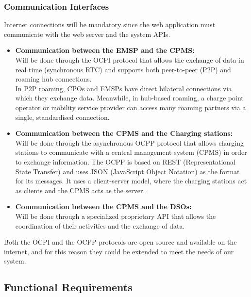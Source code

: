 \documentclass[table, 12pt]{article} %
\begin{document}
    \subsubsection{Communication Interfaces}
    Internet connections will be mandatory since the web application must communicate with the web server and the system APIs.\\
    \begin{itemize}
        \item \textbf{Communication between the EMSP and the CPMS:}\\
              Will be done through the OCPI protocol that allows the exchange of data in real time (synchronous RTC) and supports both peer-to-peer (P2P) and roaming hub connections.\\
              In P2P roaming, CPOs and EMSPs have direct bilateral connections via which they exchange data. Meanwhile, in hub-based roaming, a charge point operator or mobility service provider can access many roaming partners via a single, standardised connection.\\
        \item \textbf{Communication between the CPMS and the Charging stations:}\\
              Will be done through the asynchronous OCPP protocol that allows charging stations to communicate with a central management system (CPMS) in order to exchange information.
              The OCPP is based on REST (Representational State Transfer) and uses JSON (JavaScript Object Notation) as the format for its messages. It uses a client-server model, where the charging stations act as clients and the CPMS acts as the server.
        \item \textbf{Communication between the CPMS and the DSOs:}\\
              Will be done through a specialized proprietary API that allows the coordination of their activities and the exchange of data.
        \end{itemize}

    Both the OCPI and the OCPP protocols are open source and available on the internet, and for this reason they could be extended to meet the needs of our system.
    \newpage
    \subsection{Functional Requirements}
\end{document}
